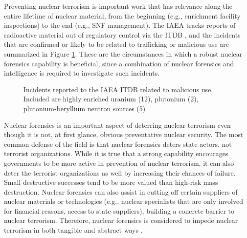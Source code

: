 Preventing nuclear terrorism is important work that has relevance along the
entire lifetime of nuclear material, from the beginning (e.g., enrichment
facility inspections) to the end (e.g., \gls{SNF} management). The \gls{IAEA}
tracks reports of radioactive material out of regulatory control via the
\gls{ITDB} \cite{itdb}, and the incidents that are confirmed or likely to be
related to trafficking or malicious use are summarized in Figure
\ref{fig:incidents}.  These are the circumstances in which a robust nuclear
forensics capability is beneficial, since a combination of nuclear forensics
and intelligence is required to investigate such incidents.  

\begin{figure}[!tbh]
  \caption[Interdicted nuclear materials for trafficking or malicious use]
          {Incidents reported to the \acrshort{IAEA} \acrshort{ITDB} related to 
          malicious use. Included are highly enriched uranium (12), 
          plutonium (2), plutonium-beryllium neutron sources (5) 
          \cite{itdb}}
  \label{fig:incidents}
\end{figure}

Nuclear forensics is an important aspect of deterring nuclear terrorism even
though it is not, at first glance, obvious preventative nuclear security.  The
most common defense of the field is that nuclear forensics deters state actors,
not terrorist organizations. While it is true that a strong capability
encourages governments to be more active in prevention of nuclear terrorism, it
can also deter the terrorist organizations as well by increasing their chances
of failure. Small destructive successes tend to be more valued than high-risk
mass destruction. Nuclear forensics can also assist in cutting off certain
suppliers of nuclear materials or technologies (e.g., nuclear specialists that
are only involved for financial reasons, access to state suppliers), building a
concrete barrier to nuclear terrorism.  Therefore, nuclear forensics is
considered to impede nuclear terrorism in both tangible and abstract ways
\cite{aps_aaas_forensics}.

